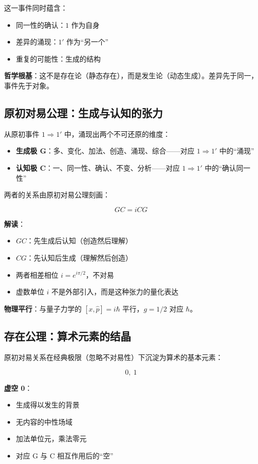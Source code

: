 \documentclass[12pt]{article}
\theoremstyle{definition}
\begin{document}
这一事件同时蕴含：
\begin{itemize}
    \item 同一性的确认：\(1\) 作为自身
    \item 差异的涌现：\(1'\) 作为“另一个”
    \item 重复的可能性：生成的结构
\end{itemize}

\textbf{哲学根基}：这不是存在论（静态存在），而是发生论（动态生成）。差异先于同一，事件先于对象。

\subsection{原初对易公理：生成与认知的张力}

从原初事件 \(1 \Rightarrow 1'\) 中，涌现出两个不可还原的维度：
\begin{itemize}
    \item \textbf{生成极 G}：多、变化、加法、创造、涌现、综合——对应 \(1 \Rightarrow 1'\) 中的“涌现”
    \item \textbf{认知极 C}：一、同一性、确认、不变、分析——对应 \(1 \Rightarrow 1'\) 中的“确认同一性”
\end{itemize}

两者的关系由原初对易公理刻画：

\[
\boxed{GC = iCG}
\]

\textbf{解读}：
\begin{itemize}
    \item \(GC\)：先生成后认知（创造然后理解）
    \item \(CG\)：先认知后生成（理解然后创造）
    \item 两者相差相位 \(i = e^{i\pi/2}\)，不对易
    \item 虚数单位 \(i\) 不是外部引入，而是这种张力的量化表达
\end{itemize}

\textbf{物理平行}：与量子力学的 \([\hat{x}, \hat{p}] = i\hbar\) 平行，\(g = 1/2\) 对应 \(\hbar\)。

\subsection{存在公理：算术元素的结晶}

原初对易关系在经典极限（忽略不对易性）下沉淀为算术的基本元素：

\[
\boxed{0,\ 1}
\]

\textbf{虚空 0}：
\begin{itemize}
    \item 生成得以发生的背景
    \item 无内容的中性场域
    \item 加法单位元，乘法零元
    \item 对应 G 与 C 相互作用后的“空”
\end{itemize}
\end{document}
